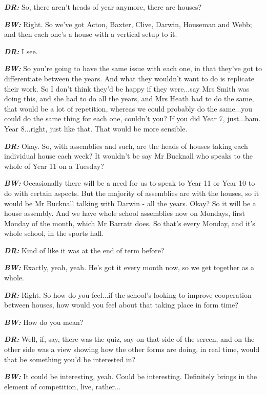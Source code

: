 \textit{\textbf{DR:}} So, there aren't heads of year anymore, there are houses?

\textit{\textbf{BW:}} Right. So we've got Acton, Baxter, Clive, Darwin, Houseman and Webb; and then each one's a house with a vertical setup to it.

\textit{\textbf{DR:}} I see.

\textit{\textbf{BW:}} So you're going to have the same issue with each one, in that they've got to differentiate between the years. And what they wouldn't want to do is replicate their work. So I don't think they'd be happy if they were...say Mrs Smith was doing this, and she had to do all the years, and Mrs Heath had to do the same, that would be a lot of repetition, whereas we could probably do the same...you could do the same thing for each one, couldn't you? If you did Year 7, just...bam. Year 8...right, just like that. That would be more sensible.

\textit{\textbf{DR:}} Okay. So, with assemblies and such, are the heads of houses taking each individual house each week? It wouldn't be say Mr Bucknall who speaks to the whole of Year 11 on a Tuesday?

\textit{\textbf{BW:}} Occasionally there will be a need for us to speak to Year 11 or Year 10 to do with certain aspects. But the majority of assemblies are with the houses, so it would be Mr Bucknall talking with Darwin - all the years. Okay? So it will be a house assembly. And we have whole school assemblies now on Mondays, first Monday of the month, which Mr Barratt does. So that's every Monday, and it's whole school, in the sports hall.

\textit{\textbf{DR:}} Kind of like it was at the end of term before?

\textit{\textbf{BW:}} Exactly, yeah, yeah. He's got it every month now, so we get together as a whole.

\textit{\textbf{DR:}} Right. So how do you feel...if the school's looking to improve cooperation between houses, how would you feel about that taking place in form time?

\textit{\textbf{BW:}} How do you mean?

\textit{\textbf{DR:}} Well, if, say, there was the quiz, say on that side of the screen, and on the other side was a view showing how the other forms are doing, in real time, would that be something you'd be interested in?

\textit{\textbf{BW:}} It could be interesting, yeah. Could be interesting. Definitely brings in the element of competition, live, rather...

